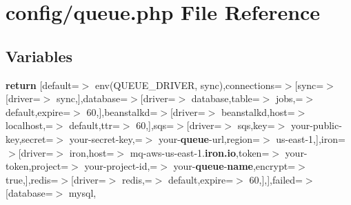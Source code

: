 \section{config/queue.php File Reference}
\label{config_2queue_8php}
\subsection*{Variables}
\begin{DoxyCompactItemize}
\item 
{\bf return} [\textquotesingle{}default\textquotesingle{}=$>$ env(\textquotesingle{}Q\+U\+E\+U\+E\+\_\+\+D\+R\+I\+V\+E\+R\textquotesingle{}, \textquotesingle{}sync\textquotesingle{}),\textquotesingle{}connections\textquotesingle{}=$>$[\textquotesingle{}sync\textquotesingle{}=$>$[\textquotesingle{}driver\textquotesingle{}=$>$ \textquotesingle{}sync\textquotesingle{},],\textquotesingle{}database\textquotesingle{}=$>$[\textquotesingle{}driver\textquotesingle{}=$>$ \textquotesingle{}database\textquotesingle{},\textquotesingle{}table\textquotesingle{}=$>$ \textquotesingle{}jobs\textquotesingle{},\textquotesingle{}=$>$ \textquotesingle{}default\textquotesingle{},\textquotesingle{}expire\textquotesingle{}=$>$ 60,],\textquotesingle{}beanstalkd\textquotesingle{}=$>$[\textquotesingle{}driver\textquotesingle{}=$>$ \textquotesingle{}beanstalkd\textquotesingle{},\textquotesingle{}host\textquotesingle{}=$>$ \textquotesingle{}localhost\textquotesingle{},\textquotesingle{}=$>$ \textquotesingle{}default\textquotesingle{},\textquotesingle{}ttr\textquotesingle{}=$>$ 60,],\textquotesingle{}sqs\textquotesingle{}=$>$[\textquotesingle{}driver\textquotesingle{}=$>$ \textquotesingle{}sqs\textquotesingle{},\textquotesingle{}key\textquotesingle{}=$>$ \textquotesingle{}your-\/public-\/key\textquotesingle{},\textquotesingle{}secret\textquotesingle{}=$>$ \textquotesingle{}your-\/secret-\/key\textquotesingle{},\textquotesingle{}=$>$ \textquotesingle{}your-\/{\bf queue}-\/url\textquotesingle{},\textquotesingle{}region\textquotesingle{}=$>$ \textquotesingle{}us-\/east-\/1\textquotesingle{},],\textquotesingle{}iron\textquotesingle{}=$>$[\textquotesingle{}driver\textquotesingle{}=$>$ \textquotesingle{}iron\textquotesingle{},\textquotesingle{}host\textquotesingle{}=$>$ \textquotesingle{}mq-\/aws-\/us-\/east-\/1.{\bf iron.\+io}\textquotesingle{},\textquotesingle{}token\textquotesingle{}=$>$ \textquotesingle{}your-\/token\textquotesingle{},\textquotesingle{}project\textquotesingle{}=$>$ \textquotesingle{}your-\/project-\/id\textquotesingle{},\textquotesingle{}=$>$ \textquotesingle{}your-\/{\bf queue}-\/{\bf name}\textquotesingle{},\textquotesingle{}encrypt\textquotesingle{}=$>$ true,],\textquotesingle{}redis\textquotesingle{}=$>$[\textquotesingle{}driver\textquotesingle{}=$>$ \textquotesingle{}redis\textquotesingle{},\textquotesingle{}=$>$ \textquotesingle{}default\textquotesingle{},\textquotesingle{}expire\textquotesingle{}=$>$ 60,],],\textquotesingle{}failed\textquotesingle{}=$>$[\textquotesingle{}database\textquotesingle{}=$>$ \textquotesingle{}mysql\textquotesingle{}, 
\end{DoxyCompactItemize}
